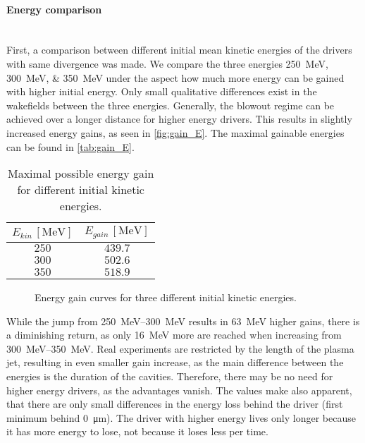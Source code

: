 \documentclass[bachelor_thesis]{subfiles}
\begin{document}
\paragraph*{Energy comparison}\hspace{0pt} \\
First, a comparison between different initial mean kinetic energies of the drivers with same divergence was made. We compare the three energies \qtylist{250; 300; 350}{\MeV} under the aspect how much more energy can be gained with higher initial energy.
Only small qualitative differences exist in the wakefields between the three energies. Generally, the blowout regime can be achieved over a longer distance for higher energy drivers.
This results in slightly increased energy gains, as seen in \autoref{fig:gain_E}. The maximal gainable energies can be found in \autoref{tab:gain_E}.
\begin{table}[h]
\begin{center}
\begin{tabular}{|c|c|} 
	\hline
 	$E_{kin} \, \mathrm{[MeV]}$ & $E_{gain} \, \mathrm{[MeV]}$ \\ 
 	\hline
	$250$ & $439.7$ \\ 
 	$300$ & $502.6$ \\
	$350$ & $518.9$ \\
	\hline
\end{tabular}
\caption{Maximal possible energy gain for different initial kinetic energies.}\label{tab:gain_E}
\end{center}
\end{table}

\begin{figure}
	\centering
	
	\caption{Energy gain curves for three different initial kinetic energies.}
	\label{fig:gain_E}
\end{figure}

While the jump from \qtyrange{250}{300}{\MeV} results in \qty{63}{\MeV} higher gains, there is a diminishing return, as only \qty{16}{\MeV} more are reached when increasing from \qtyrange{300}{350}{\MeV}. Real experiments are restricted by the length of the plasma jet, 
resulting in even smaller gain increase, as the main difference between the energies is the duration of the cavities. Therefore, there may be no need for higher energy drivers, as the advantages vanish.
The values make also apparent, that there are only small differences in the energy loss behind the driver (first minimum behind \qty{0}{\um}). The driver with higher energy lives only longer because it has more energy to lose, not because it loses less per time.
\end{document}
